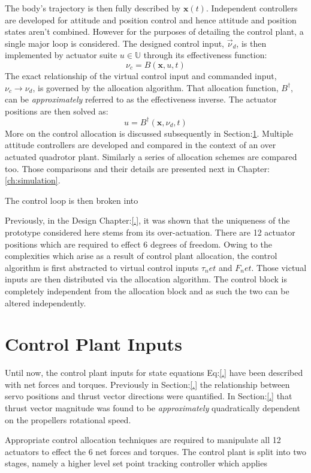 The body's trajectory is then fully described by $\mathbf{x}(t)$. Independent controllers are developed for attitude and position control and hence attitude and position states aren't combined. However for the purposes of detailing the control plant, a single major loop is considered. The designed control input, $\vec{\nu}_d$, is then implemented by actuator suite $u\in\mathbb{U}$ through its effectiveness function:
\\
\vspace{-5pt}
\begin{equation}
\nu_c=B(\mathbf{x},u,t)
\end{equation}
The exact relationship of the virtual control input and commanded input, $\nu_c\rightarrow\nu_d$, is governed by the allocation algorithm. That allocation function, $B^\dagger$, can be \emph{approximately} referred to as the effectiveness inverse. The actuator positions are then solved as:
\begin{equation}
u=B^{\dagger}(\mathbf{x},\nu_d,t)
\end{equation}
More on the control allocation is discussed subsequently in Section:\ref{sec:control.inputs}. Multiple attitude controllers are developed and compared in the context of an over actuated quadrotor plant. Similarly a series of allocation schemes are compared too. Those comparisons and their details are presented next in Chapter:\ref{ch:simulation}. 
\par
The control loop is then broken into 

Previously, in the Design Chapter:\ref{.}, it was shown that the uniqueness of the prototype considered here stems from its over-actuation. There are 12 actuator positions which are required to effect 6 degrees of freedom. Owing to the complexities which arise as a result of control plant allocation, the control algorithm is first abstracted to virtual control inputs $\tau_net$ and $F_net$. Those victual inputs are then distributed via the allocation algorithm. The control block is completely independent from the allocation block and as such the two can be altered independently.
\section{Control Plant Inputs}
\label{sec:control.inputs}
Until now, the control plant inputs for state equations Eq:\ref{.} have been described with net forces and torques. Previously in Section:\ref{.} the relationship between servo positions and thrust vector directions were quantified. In Section:\ref{.} that thrust vector magnitude was found to be \emph{approximately} quadratically dependent on the propellers rotational speed. 
\par
Appropriate control allocation techniques are required to manipulate all 12 actuators to effect the 6 net forces and torques. The control plant is split into two stages, namely a higher level set point tracking controller which applies 

